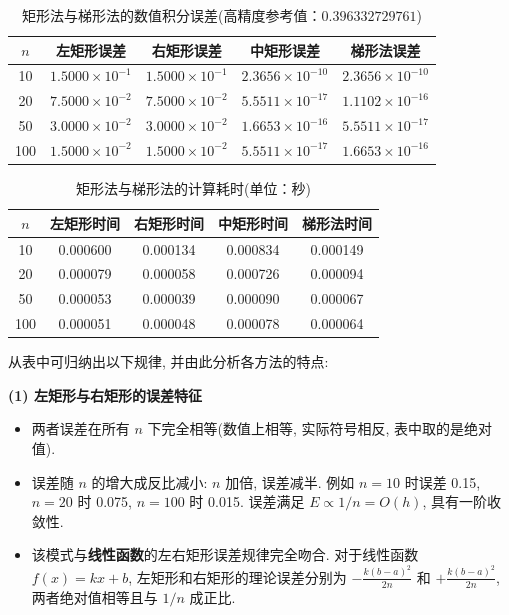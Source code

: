 \documentclass[12pt,a4paper]{ctexart}
\begin{document}
\begin{table}[H]
    \centering
    \caption{矩形法与梯形法的数值积分误差(高精度参考值：$0.396332729761$)}
    \label{tab:rect_trap_error}
    \small
    \begin{tabular}{c|cccc}
        \hline
        $n$ & 左矩形误差 & 右矩形误差 & 中矩形误差 & 梯形法误差 \\
        \hline
        10 & $1.5000\times10^{-1}$ & $1.5000\times10^{-1}$ & $2.3656\times10^{-10}$ & $2.3656\times10^{-10}$ \\
        20 & $7.5000\times10^{-2}$ & $7.5000\times10^{-2}$ & $5.5511\times10^{-17}$ & $1.1102\times10^{-16}$ \\
        50 & $3.0000\times10^{-2}$ & $3.0000\times10^{-2}$ & $1.6653\times10^{-16}$ & $5.5511\times10^{-17}$ \\
        100& $1.5000\times10^{-2}$ & $1.5000\times10^{-2}$ & $5.5511\times10^{-17}$ & $1.6653\times10^{-16}$ \\
        \hline
    \end{tabular}
\end{table}

\begin{table}[H]
    \centering
    \caption{矩形法与梯形法的计算耗时(单位：秒)}
    \label{tab:rect_trap_time}
    \small
    \begin{tabular}{c|cccc}
        \hline
        $n$ & 左矩形时间 & 右矩形时间 & 中矩形时间 & 梯形法时间 \\
        \hline
        10 & 0.000600 & 0.000134 & 0.000834 & 0.000149 \\
        20 & 0.000079 & 0.000058 & 0.000726 & 0.000094 \\
        50 & 0.000053 & 0.000039 & 0.000090 & 0.000067 \\
        100& 0.000051 & 0.000048 & 0.000078 & 0.000064 \\
        \hline
    \end{tabular}
\end{table}

从表中可归纳出以下规律, 并由此分析各方法的特点: 

\textbf{(1) 左矩形与右矩形的误差特征}
\begin{itemize}
    \item 两者误差在所有 $n$ 下完全相等(数值上相等, 实际符号相反, 表中取的是绝对值). 
    \item 误差随 $n$ 的增大成反比减小: $n$ 加倍, 误差减半. 例如 $n=10$ 时误差 0.15, $n=20$ 时 0.075, $n=100$ 时 0.015. 误差满足 $E \propto 1/n = O(h)$, 具有一阶收敛性. 
    \item 该模式与\textbf{线性函数}的左右矩形误差规律完全吻合. 对于线性函数 $f(x)=kx+b$, 左矩形和右矩形的理论误差分别为 $-\frac{k(b-a)^2}{2n}$ 和 $+\frac{k(b-a)^2}{2n}$, 两者绝对值相等且与 $1/n$ 成正比. 
\end{itemize}
\end{document}
